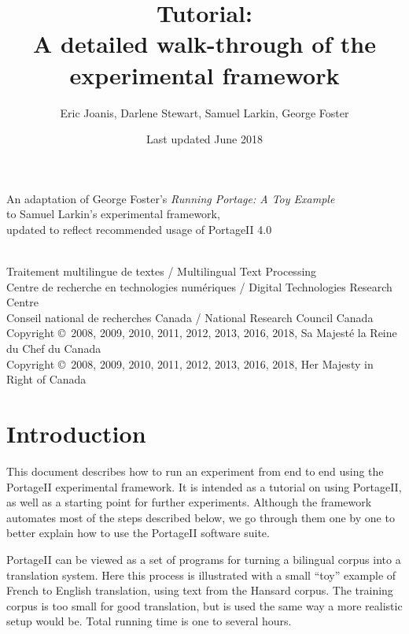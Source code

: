 \documentclass[11pt,letterpaper]{article}
\title{\PS Tutorial: \\
       A detailed walk-through of the \\
       experimental framework}
\date{Last updated June 2018}
\author{Eric Joanis, Darlene Stewart, Samuel Larkin, George Foster}
\newcommand{\PS}{PortageII\xspace}
\begin{document}
\vfill

\maketitle

\vfill

\begin{center}
An adaptation of George Foster's \emph{Running Portage: A Toy Example} \\
to Samuel Larkin's experimental framework,\\
updated to reflect recommended usage of PortageII 4.0
\end{center}

\vfill
\vfill

\begin{center}
{~} \\ \footnotesize
   Traitement multilingue de textes / Multilingual Text Processing \\
   Centre de recherche en technologies numériques / Digital Technologies Research Centre \\
   Conseil national de recherches Canada / National Research Council Canada \\
   Copyright \copyright\ 2008, 2009, 2010, 2011, 2012, 2013, 2016, 2018, Sa Majesté la Reine du Chef du Canada
   \\ Copyright \copyright\ 2008, 2009, 2010, 2011, 2012, 2013, 2016, 2018, Her Majesty in Right of Canada
\end{center}

\vfill

\newpage


\tableofcontents


\newpage


\section{Introduction}

This document describes how to run an experiment from end to end using the \PS
experimental framework. It is intended as a tutorial on using \PS, as well as a
starting point for further experiments.  Although the framework automates most
of the steps described below, we go through them one by one to
better explain how to use the \PS software suite.

\PS can be viewed as a set of programs for turning a bilingual corpus into a
translation system. Here this process is illustrated with a small ``toy''
example of French to English translation, using text from the Hansard corpus.
The training corpus is too small for good translation, but is used the same way
a more realistic setup would be. Total running time is one to several hours.
\end{document}
